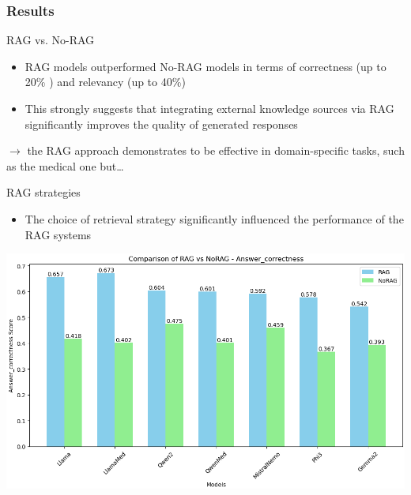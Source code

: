 \documentclass[handout]{beamer}\mode<handout>{\usetheme{AMSBolognaFC}}
\begin{document}
\begin{frame}[allowframebreaks]
    \frametitle{Results}

    \begin{block}{RAG vs. No-RAG}
        \begin{itemize}
            \item RAG models outperformed No-RAG models in terms of \alert{correctness} (\alert{up to 20\%} ) and \alert{relevancy} (\alert{up to 40\%})
            \item This strongly suggests that integrating external knowledge sources via RAG \alert{significantly improves} the quality of generated responses
            
        \end{itemize}
    \end{block}
     $\rightarrow$ the RAG approach demonstrates to be effective in domain-specific tasks, such as the medical one but\ldots
     
    \begin{block}{RAG strategies}
        \begin{itemize}
            \item The choice of retrieval strategy significantly influenced the performance of the RAG systems
         \end{itemize}
    \end{block}


    
    \framebreak

    \vfill
    \centering
    \includegraphics[width=\textwidth]{figures/RAGvsNoRAG_correctness}


\end{frame}
\end{document}
